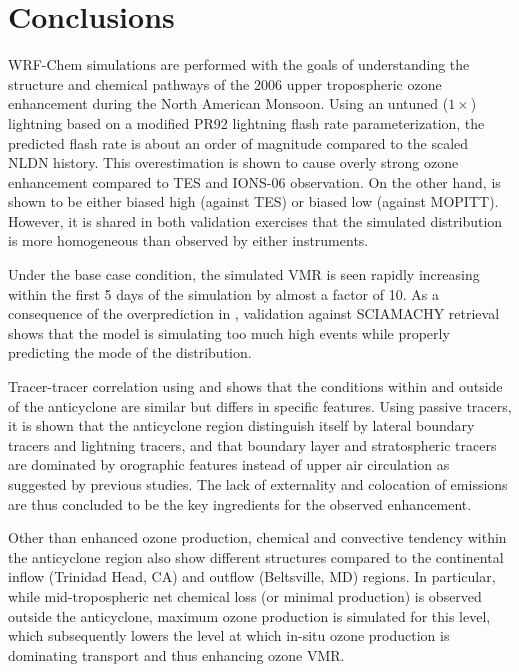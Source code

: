 \newpage\section{Conclusions}\label{sec:2006/conslusion}

WRF-Chem simulations are performed with the goals of understanding the structure and chemical pathways of
the 2006 upper tropospheric ozone enhancement during the North American Monsoon. Using an untuned ($1\times$)
lightning based on a modified PR92 lightning flash rate parameterization, the predicted flash rate is about an order
of magnitude compared to the scaled NLDN history. This overestimation is shown to cause overly strong ozone
enhancement compared to TES and IONS-06 observation. On the other hand,  is shown to be either
biased high (against TES) or biased low (against MOPITT). However, it is shared in both validation exercises that
the simulated  distribution is more homogeneous than observed by either instruments.

Under the base case condition, the simulated  VMR is seen rapidly increasing within the first 5
days of the simulation by almost a factor of 10. As a consequence of the overprediction in {\lnox}, validation
against SCIAMACHY  retrieval shows that the model is simulating too much high 
events while properly predicting the mode of the distribution.

Tracer-tracer correlation using  and  shows that the conditions within and outside of the
anticyclone are similar but differs in specific features. Using passive tracers, it is shown that the anticyclone region
distinguish itself by lateral boundary tracers and lightning tracers, and that boundary layer and stratospheric tracers
are dominated by orographic features instead of upper air circulation as suggested by previous studies. The
lack of externality and colocation of emissions are thus concluded to be the key ingredients for the observed
enhancement.

Other than enhanced ozone production, chemical and convective tendency within the anticyclone region also
show different structures compared to the continental inflow (Trinidad Head, CA) and outflow (Beltsville, MD)
regions. In particular, while mid-tropospheric net chemical loss (or minimal production) is observed outside
the anticyclone, maximum ozone production is simulated for this level, which subsequently lowers the level
at which in-situ ozone production is dominating transport and thus enhancing ozone VMR.

